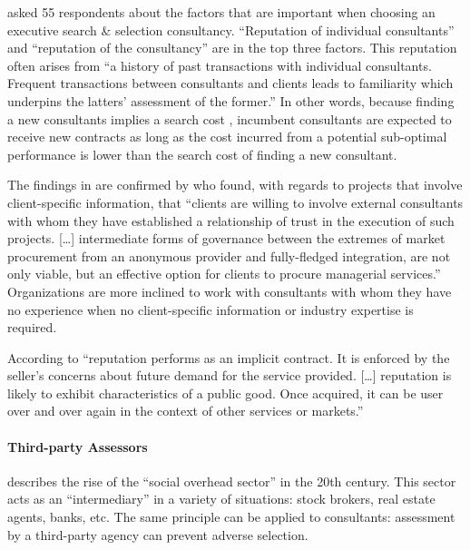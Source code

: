 \documentclass[12pt]{article}
\begin{document}
\citet[243-244]{clark1993} asked 55 respondents about the factors that
are important when choosing an executive search \& selection
consultancy. ``Reputation of individual consultants'' and ``reputation
of the consultancy'' are in the top three factors. This reputation often
arises from ``a history of past transactions with individual
consultants. Frequent transactions between consultants and clients leads
to familiarity which underpins the latters' assessment of the former.''
In other words, because finding a new consultants implies a search cost
\citep[ 1072]{wilson2012}, incumbent consultants are expected to receive
new contracts as long as the cost incurred from a potential sub-optimal
performance is lower than the search cost of finding a new consultant.

The findings in \citet{clark1993} are confirmed by
\citet[285]{richter2009} who found, with regards to projects that
involve client-specific information, that ``clients are willing to
involve external consultants with whom they have established a
relationship of trust in the execution of such projects. {[}\ldots{]}
intermediate forms of governance between the extremes of market
procurement from an anonymous provider and fully-fledged integration,
are not only viable, but an effective option for clients to procure
managerial services.'' Organizations are more inclined to work with
consultants with whom they have no experience when no client-specific
information or industry expertise is required.

According to \citet[516]{nayyar1990} ``reputation performs as an
implicit contract. It is enforced by the seller's concerns about future
demand for the service provided. {[}\ldots{]} reputation is likely to
exhibit characteristics of a public good. Once acquired, it can be user
over and over again in the context of other services or markets.''

\hypertarget{third-party-assessors}{%
\paragraph{Third-party Assessors}\label{third-party-assessors}}

\citet[57-62]{zucker1985} describes the rise of the ``social overhead
sector'' in the 20th century. This sector acts as an ``intermediary'' in
a variety of situations: stock brokers, real estate agents, banks, etc.
The same principle can be applied to consultants: assessment by a
third-party agency can prevent adverse selection.
\end{document}
